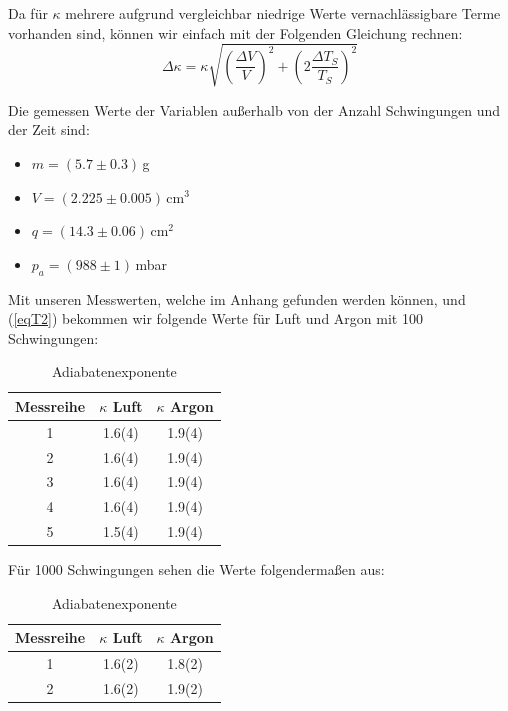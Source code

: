 \documentclass[11pt,a4paper]{article}
\begin{document}
Da f\"ur $\kappa$ mehrere aufgrund vergleichbar niedrige Werte vernachl\"assigbare Terme vorhanden sind, k\"onnen wir einfach mit der Folgenden Gleichung rechnen:
\begin{equation}\Delta \kappa  = \kappa \sqrt{\left({\frac{\Delta V}{V}}\right)^2 + \left({2\frac{\Delta T_S}{T_S}}\right)^2} \end{equation}

Die gemessen Werte der Variablen au\ss erhalb von der Anzahl Schwingungen und der Zeit sind:
\begin{itemize}
\item $m=(5.7\pm0.3)\,$g
\item $V=(2.225\pm0.005)\,$cm$^3$
\item $q=(14.3\pm0.06)\,$cm$^2$
\item $p_a=(988\pm1)$\,mbar
\end{itemize}

Mit unseren Messwerten, welche im Anhang gefunden werden k\"onnen, und (\ref{eqT2}) bekommen wir folgende Werte f\"ur Luft und Argon mit 100 Schwingungen:

\begin{table}[h]
\centering
\renewcommand\thetable{T1}
\caption{Adiabatenexponente}
\vspace{11pt}
\begin{tabular}{ccc}
\toprule
Messreihe & $\kappa$ Luft &  $\kappa$ Argon\\
\midrule
1 & 1.6(4) & 1.9(4)\\
2 & 1.6(4) & 1.9(4)\\
3 & 1.6(4) & 1.9(4)\\
4 & 1.6(4) & 1.9(4)\\
5 & 1.5(4) & 1.9(4)\\
\bottomrule 
\end{tabular}
\label{tab:B1}
\end{table}

\pagebreak

F\"ur 1000 Schwingungen sehen die Werte folgenderma\ss en aus:

\begin{table}[h]
\centering
\renewcommand\thetable{T1}
\caption{Adiabatenexponente}
\vspace{11pt}
\begin{tabular}{ccc}
\toprule
Messreihe & $\kappa$ Luft &  $\kappa$ Argon\\
\midrule
1 & 1.6(2) & 1.8(2)\\
2 & 1.6(2) & 1.9(2)\\
\bottomrule 
\end{tabular}
\label{tab:B1}
\end{table}
\end{document}
